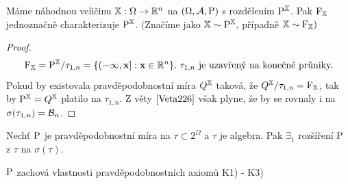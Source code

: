 \begin{theorem}
	Máme náhodnou veličinu $\mathbb{X}:\Omega\to\mathbb{R}^n$ na $(\Omega,\mathcal{A},\mathrm{P})$ s rozdělením $\mathrm{P}^{\mathbb{X}}$. Pak $\mathrm{F}_{\mathbb{X}}$ jednoznačně charakterizuje $\mathrm{P}^{\mathbb{X}}$. $($Značíme jako $\mathbb{X}\sim \mathrm{P}^{\mathbb{X}},$ případně $ \mathbb{X}\sim \mathrm{F}_{\mathbb{X}})$
	\begin{proof}
		\[
		\mathrm{F}_{\mathbb{X}} = \mathrm{P}^{\mathbb{X}} / \tau_{1,n} = \{ (-\infty,\textbf{x}]:\textbf{x}\in\mathbb{R}^n \}.~ \tau_{1,n} \text{ je uzavřený na konečné průniky.}
		\]
		Pokud by existovala pravděpodobnostní míra $ Q^{\mathbb{X}}$ taková, že $ Q^{\mathbb{X}} / \tau_{1,n} = \mathrm{F}_{\mathbb{X}}$, tak by $\mathrm{P}^{\mathbb{X}}=Q^{\mathbb{X}}$ platilo na $\tau_{1,n}$. Z věty $ \ref{Veta226}$ však plyne, že by se rovnaly i na $\sigma(\tau_{1,n})=\mathcal{B}_n $.
	\end{proof}
\end{theorem}
\begin{dusl}\label{rozsireni}
	Nechť $\mathrm{P}$ je pravděpodobnostní míra na $\tau \subset 2^\Omega$ a $\tau$ je algebra. Pak $\exists_1 $ rozšíření $\mathrm{P}$ z $\tau$ na $\sigma(\tau)$.
	
\end{dusl}
\begin{remark}
	$\mathrm{P}$ zachová vlastnosti pravděpodobnostních axiomů K1) - K3) 
\end{remark}
